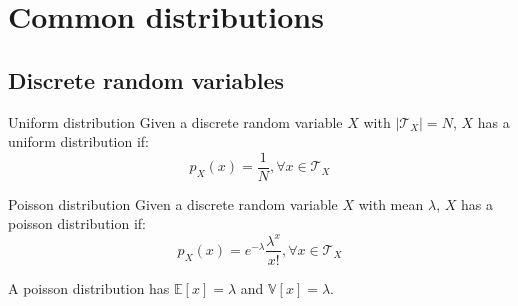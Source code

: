 \section{Common distributions}

\subsection{Discrete random variables}
\begin{descriptionlist}
    \item[Uniform distribution] 
        Given a discrete random variable $X$ with $\vert \mathcal{T}_X \vert = N$,
        $X$ has a uniform distribution if:
        \[ p_X(x) = \frac{1}{N}, \forall x \in \mathcal{T}_X \]
    
    \item[Poisson distribution] 
        Given a discrete random variable $X$ with mean $\lambda$,
        $X$ has a poisson distribution if:
        \[ p_X(x) = e^{-\lambda} \frac{\lambda^x}{x!}, \forall x \in \mathcal{T}_X \]

        A poisson distribution has $\mathbb{E}[x] = \lambda$ and $\mathbb{V}[x] = \lambda$.
\end{descriptionlist}


